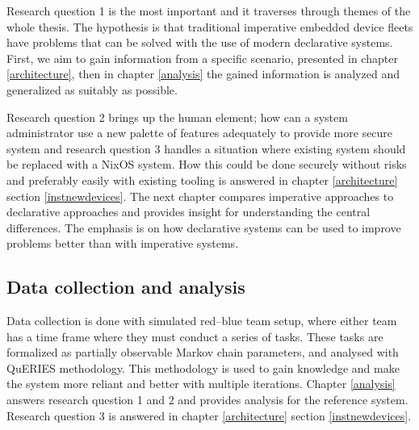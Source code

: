 Research question 1 is the most important and it traverses through
themes of the whole thesis. The hypothesis is that traditional
imperative embedded device fleets have problems that can be solved
with the use of modern declarative systems. First, we aim to gain
information from a specific scenario, presented in chapter
\ref{architecture}, then in chapter \ref{analysis} the gained
information is analyzed and generalized as suitably as possible.

Research question 2 brings up the human element; how can a system
administrator use a new palette of features adequately to provide more
secure system and research question 3 handles a situation where
existing system should be replaced with a NixOS system. How this could
be done securely without risks and preferably easily with existing
tooling is answered in chapter \ref{architecture} section
\ref{instnewdevices}. The next chapter compares imperative approaches
to declarative approaches and provides insight for understanding the
central differences. The emphasis is on how declarative systems can be
used to improve problems better than with imperative systems.

\subsection{Data collection and analysis}

Data collection is done with simulated red–blue team setup, where
either team has a time frame where they must conduct a series of
tasks. These tasks are formalized as partially observable Markov chain
parameters, and analysed with QuERIES methodology. This methodology is
used to gain knowledge and make the system more reliant and better
with multiple iterations. Chapter \ref{analysis} answers research
question 1 and 2 and provides analysis for the reference
system. Research question 3 is answered in chapter \ref{architecture}
section \ref{instnewdevices}.
